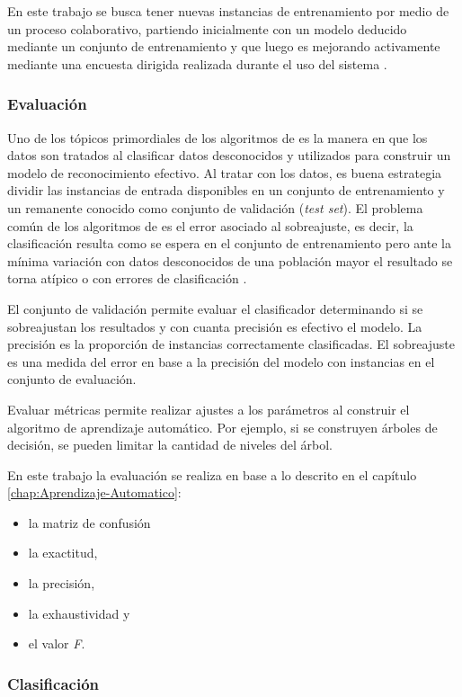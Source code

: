 En este trabajo se busca tener nuevas instancias de entrenamiento
por medio de un proceso colaborativo, partiendo inicialmente con un
modelo deducido mediante un conjunto de entrenamiento y que luego
es mejorando activamente mediante una encuesta dirigida realizada
durante el uso del sistema .

\subsubsection{Evaluación}

Uno de los tópicos primordiales de los algoritmos de  es
la manera en que los datos son tratados al clasificar datos desconocidos
y utilizados para construir un modelo de reconocimiento efectivo.
Al tratar con los datos, es buena estrategia dividir las instancias
de entrada disponibles en un conjunto de entrenamiento y un remanente
conocido como conjunto de validación (\emph{test set}). El problema
común de los algoritmos de  es el error asociado al sobreajuste,
es decir, la clasificación resulta como se espera en el conjunto de
entrenamiento pero ante la mínima variación con datos desconocidos
de una población mayor el resultado se torna atípico o con errores
de clasificación \cite{Rajaraman2011}. 

El conjunto de validación permite evaluar el clasificador determinando
si se sobreajustan los resultados y con cuanta precisión es efectivo
el modelo. La precisión es la proporción de instancias correctamente
clasificadas. El sobreajuste es una medida del error en base a la
precisión del modelo con instancias en el conjunto de evaluación.

Evaluar métricas permite realizar ajustes a los parámetros al construir
el algoritmo de aprendizaje automático. Por ejemplo, si se construyen
árboles de decisión, se pueden limitar la cantidad de niveles del
árbol.

En este trabajo la evaluación se realiza en base a lo descrito en
el capítulo \ref{chap:Aprendizaje-Automatico}:
\begin{itemize}
\item la matriz de confusión 
\item la exactitud, 
\item la precisión, 
\item la exhaustividad y 
\item el valor \emph{F}.
\end{itemize}

\subsubsection{Clasificación}

